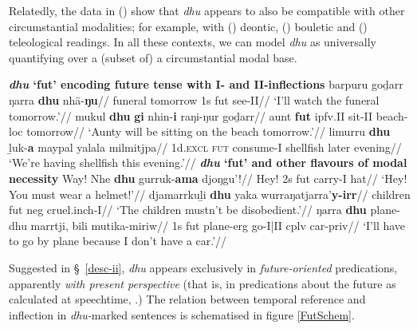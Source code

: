 Relatedly, the data in () show that \textit{dhu} appears to also be compatible with other circumstantial modalities; for example, with () deontic, () bouletic and () teleological readings. In all these contexts, we can model \textit{dhu} as universally quantifying over a (subset of) a circumstantial modal base.

\pex \textbf{\textit{dhu} `\gls{fut}' encoding future tense with \gls{I}- and \gls{II}-inflections}
\a\begingl\gla barpuru goḏarr ŋarra \textbf{dhu} nhä-\textbf{ŋu}//
\glb funeral tomorrow 1s \gls{fut} see-\gls{II}//
\glft`I'll watch the funeral tomorrow.'\trailingcitation{}//
\endgl
\a\begingl\gla mukul \textbf{dhu} \textbf{gi} nhin-\textbf{i} raŋi-ŋur goḏarr//
\glb aunt \textbf{\gls{fut}} \gls{ipfv}.\gls{II} sit-\gls{II} beach-\gls{loc} tomorrow//
\glft`Aunty will be sitting on the beach tomorrow.'\trailingcitation{[AW~20190409]}//\endgl
\a\begingl\gla limurru \textbf{dhu} ḻuk-\textbf{a} maypal yalala milmitjpa//
\glb 1d.\textsc{excl} \textsc{fut} consume-\gls{I} shellfish later evening//
\glft `We're having shellfish this evening.'\trailingcitation{[DhG~20190417]}//
\endgl
\xe
\pex \textbf{\textit{dhu} `\gls{fut}' and other flavours of modal necessity}
\a\begingl\gla Way! Nhe \textbf{dhu} gurruk-\textbf{ama} djoŋgu'!//
\glb Hey! 2s \gls{fut} carry-\gls{I} hat//
\glft`Hey! You must wear a helmet!'\trailingcitation{[DhG~20190405]}//\endgl
\a\begingl\gla djamarrkuḻi \textbf{dhu} yaka wurraŋatjarra'\textbf{y-irr}//
\glb children \gls{fut} \gls{neg} cruel.\gls{inch}-\gls{I}//
\glft`The children mustn't be disobedient.'\trailingcitation{[AW~20190429]}//\endgl
\a\begingl\gla ŋarra \textbf{dhu} plane-dhu marrtji, bili mutika-miriw//
\glb 1s \gls{fut} plane-\gls{erg} go-\gls{I}|\gls{II} \gls{cplv} car-\gls{priv}//
\glft`I'll have to go by plane because I don't have a car.'\trailingcitation{[AW~20190429]}//\endgl
\xe

\noindent Suggested in \S~\ref{desc-ii}, \textit{dhu} appears exclusively in \textit{future-oriented} predications, apparently \textit{with present perspective} (that is, in predications about the future as calculated at speechtime, \citealp[see][]{Condoravdi2002}.) The relation between temporal reference and inflection in \textit{dhu-}marked sentences is schematised in figure \ref{FutSchem}.

